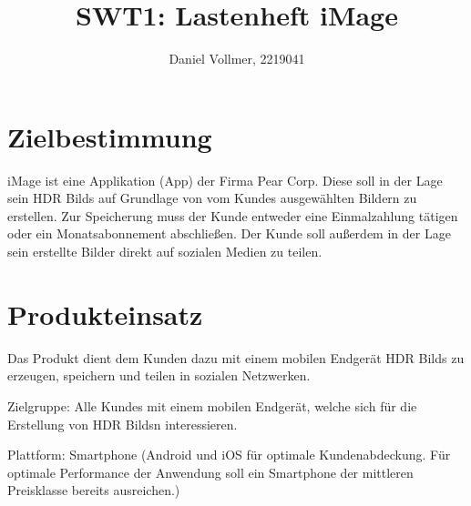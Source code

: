 \documentclass[parskip=full]{scrartcl}
\title{SWT1: Lastenheft iMage}
\author{Daniel Vollmer, 2219041}
\begin{document}
\maketitle

%
%
\section{Zielbestimmung}
iMage ist eine \gls{Applikation} (App) der Firma Pear Corp. Diese soll in der Lage sein \glspl{HDR Bild} auf Grundlage von vom \glspl{Kunde} ausgewählten Bildern zu erstellen. Zur Speicherung muss der Kunde entweder eine Einmalzahlung tätigen oder ein Monatsabonnement abschließen. Der Kunde soll außerdem in der Lage sein erstellte Bilder direkt auf sozialen Medien zu teilen.

\section{Produkteinsatz}
Das Produkt dient dem Kunden dazu mit einem mobilen Endgerät \glspl{HDR Bild} zu erzeugen, speichern und teilen in sozialen Netzwerken.

Zielgruppe: Alle \glspl{Kunde} mit einem mobilen Endgerät, welche sich für die Erstellung von \glspl{HDR Bild}n interessieren.

Plattform: Smartphone (Android und iOS für optimale Kundenabdeckung. Für optimale Performance der Anwendung soll ein Smartphone der mittleren Preisklasse bereits ausreichen.)
\end{document}
